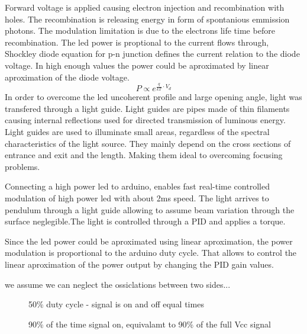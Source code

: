 \documentclass[\main/master.tex]{subfiles}
\begin{document}
\par\noindent
Forward voltage is applied causing electron injection and recombination with holes. The recombination is releasing energy in form of spontanious emmission photons. The modulation limitation is due to the electrons life time before recombination. The led power is proptional to the current flows through, Shockley diode equation for p-n junction defines the current relation to the diode voltage. In high enough values the power could be aproximated by linear aproximation of the diode voltage.
\begin{equation}
P\propto e^{\frac{q}{kT}\cdot V_d}\label{eqn:energy-mass-equivalence-relation}
\end{equation}
In order to overcome the led uncoherent profile and large opening angle, light was transfered through a light guide. Light guides are pipes made of thin filaments causing internal reflections used for directed transmission of luminous energy. Light guides are used to illuminate small areas, regardless of the spectral characteristics of the light source. They mainly depend on the cross sections of entrance and exit and the length. Making them ideal to overcoming focusing problems.
\par\noindent
Connecting a high power led to arduino, enables fast real-time controlled modulation of high power led with about 2ms speed. The light arrives to pendulum through a light guide allowing to assume beam variation through the surface neglegible.The light is controlled through a PID and applies a torque.
\par\noindent
Since the led power could be aproximated using linear aproximation, the power modulation is proportional to the arduino duty cycle. That allows to control the linear aproximation of the power output by changing the PID gain values.  
\par\noindent
we assume we can neglect the ossiclations between two sides...



\begin{figure}[htbp]
	\centering
	\caption[duty cycle 50\%]{50\% duty cycle  - signal is on and off equal times}
	\label{fig:duty50}
\end{figure}
 
\begin{figure}[htbp]
	\centering
	\caption[duty cycle 90\%]{90\% of the time signal on, equivalamt to 90\% of the full Vcc signal}
	\label{fig:duty90}
\end{figure}
\end{document}
